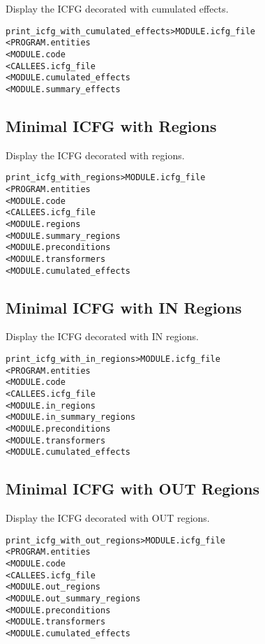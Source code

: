 \documentclass[a4paper]{report}
\newenvironment{PipsMake}{\begin{alltt}}{\end{alltt}}
\newenvironment{PipsPass}[1]{\label{pass:#1}}{}
\begin{document}
\begin{PipsPass}{print_icfg_with_cumulated_effects}
Display the ICFG decorated with cumulated effects.
\end{PipsPass}
\begin{PipsMake}
print_icfg_with_cumulated_effects        > MODULE.icfg_file
        < PROGRAM.entities
        < MODULE.code
        < CALLEES.icfg_file
        < MODULE.cumulated_effects
        < MODULE.summary_effects
\end{PipsMake}

\subsection{Minimal ICFG with Regions}

\begin{PipsPass}{print_icfg_with_regions}
Display the ICFG decorated with regions.
\end{PipsPass}
\begin{PipsMake}
print_icfg_with_regions                  > MODULE.icfg_file
        < PROGRAM.entities
        < MODULE.code
        < CALLEES.icfg_file
        < MODULE.regions
        < MODULE.summary_regions
        < MODULE.preconditions
        < MODULE.transformers
        < MODULE.cumulated_effects
\end{PipsMake}

\subsection{Minimal ICFG with IN Regions}

\begin{PipsPass}{print_icfg_with_in_regions}
Display the ICFG decorated with IN regions.
\end{PipsPass}
\begin{PipsMake}
print_icfg_with_in_regions               > MODULE.icfg_file
        < PROGRAM.entities
        < MODULE.code
        < CALLEES.icfg_file
        < MODULE.in_regions
        < MODULE.in_summary_regions
        < MODULE.preconditions
        < MODULE.transformers
        < MODULE.cumulated_effects
\end{PipsMake}

\subsection{Minimal ICFG with OUT Regions}

\begin{PipsPass}{print_icfg_with_out_regions}
Display the ICFG decorated with OUT regions.
\end{PipsPass}
\begin{PipsMake}
print_icfg_with_out_regions              > MODULE.icfg_file
        < PROGRAM.entities
        < MODULE.code
        < CALLEES.icfg_file
        < MODULE.out_regions
        < MODULE.out_summary_regions
        < MODULE.preconditions
        < MODULE.transformers
        < MODULE.cumulated_effects
\end{PipsMake}
\end{document}
